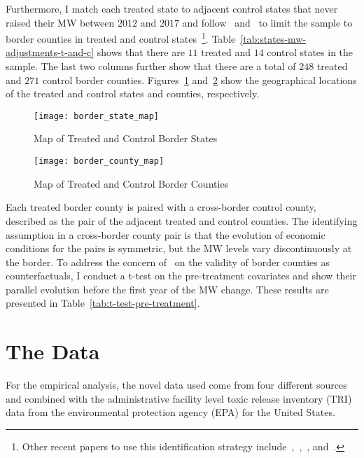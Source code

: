 \documentclass[12pt, english]{article}
\begin{document}
    Furthermore, I match each treated state to adjacent control states that never raised their MW between $2012$ and $2017$ and follow~\cite{dube2010minimum} and~\cite{gopalan2021state} to limit the sample to border counties in treated and control states~\footnote{\tiny Other recent papers to use this identification strategy include~\cite{aaronson2018industry},~\cite{dube2019fairness},~\cite{jardim2018minimum}, and~\cite{zhang2019distributional}.}. Table~\ref{tab:states-mw-adjustments-t-and-c} shows that there are $11$ treated and $14$ control states in the sample. The last two columns further show that there are a total of $248$ treated and $271$ control border counties. Figures~\ref{fig:border-state-map} and~\ref{fig:border-county-map} show the geographical locations of the treated and control states and counties, respectively.
    \begin{figure}[H]
        \centering
        \texttt{[image: border\_state\_map]}
        \caption{Map of Treated and Control Border States}
        \label{fig:border-state-map}
    \end{figure}

    \begin{figure}[H]
        \centering
        \texttt{[image: border\_county\_map]}
        \caption{Map of Treated and Control Border Counties}
        \label{fig:border-county-map}
    \end{figure}
    Each treated border county is paired with a cross-border control county, described as the pair of the adjacent treated and control counties. The identifying assumption in a cross-border county pair is that the evolution of economic conditions for the pairs is symmetric, but the MW levels vary discontinuously at the border. To address the concern of~\cite{neumark2014revisiting} on the validity of border counties as counterfactuals, I conduct a t-test on the pre-treatment covariates and show their parallel evolution before the first year of the MW change. These results are presented in Table~\ref{tab:t-test-pre-treatment}.


    \section{The Data}\label{sec:data-and-methods}
    For the empirical analysis, the novel data used come from four different sources and combined with the administrative facility level toxic release inventory (TRI) data from the environmental protection agency (EPA) for the United States.
\end{document}
